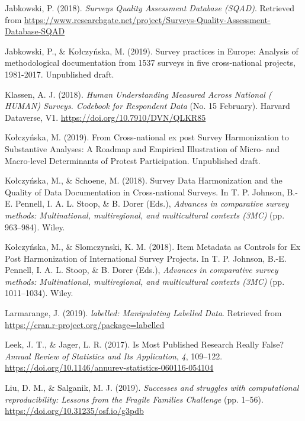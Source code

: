 \documentclass[12pt,]{article}
\begin{document}
\leavevmode\hypertarget{ref-Jabkowski2018}{}%
Jabkowski, P. (2018). \emph{Surveys Quality Assessment Database (SQAD)}. Retrieved from \url{https://www.researchgate.net/project/Surveys-Quality-Assessment-Database-SQAD}

\leavevmode\hypertarget{ref-Jabkowski2019}{}%
Jabkowski, P., \& Kołczyńska, M. (2019). Survey practices in Europe: Analysis of methodological documentation from 1537 surveys in five cross-national projects, 1981-2017. Unpublished draft.

\leavevmode\hypertarget{ref-Klassen2018}{}%
Klassen, A. J. (2018). \emph{Human Understanding Measured Across National ( HUMAN) Surveys. Codebook for Respondent Data} (No. 15 February). Harvard Dataverse, V1. \url{https://doi.org/10.7910/DVN/QLKR85}

\leavevmode\hypertarget{ref-Kolczynska2019}{}%
Kołczyńska, M. (2019). From Cross-national ex post Survey Harmonization to Substantive Analyses: A Roadmap and Empirical Illustration of Micro- and Macro-level Determinants of Protest Participation. Unpublished draft.

\leavevmode\hypertarget{ref-KolczynskaSchoene2018}{}%
Kołczyńska, M., \& Schoene, M. (2018). Survey Data Harmonization and the Quality of Data Documentation in Cross‐national Surveys. In T. P. Johnson, B.-E. Pennell, I. A. L. Stoop, \& B. Dorer (Eds.), \emph{Advances in comparative survey methods: Multinational, multiregional, and multicultural contexts (3MC)} (pp. 963--984). Wiley.

\leavevmode\hypertarget{ref-KolczynskaSlomczynski2018}{}%
Kołczyńska, M., \& Slomczynski, K. M. (2018). Item Metadata as Controls for Ex Post Harmonization of International Survey Projects. In T. P. Johnson, B.-E. Pennell, I. A. L. Stoop, \& B. Dorer (Eds.), \emph{Advances in comparative survey methods: Multinational, multiregional, and multicultural contexts (3MC)} (pp. 1011--1034). Wiley.

\leavevmode\hypertarget{ref-labelled}{}%
Larmarange, J. (2019). \emph{labelled: Manipulating Labelled Data}. Retrieved from \url{https://cran.r-project.org/package=labelled}

\leavevmode\hypertarget{ref-Leek2017}{}%
Leek, J. T., \& Jager, L. R. (2017). Is Most Published Research Really False? \emph{Annual Review of Statistics and Its Application}, \emph{4}, 109--122. \url{https://doi.org/10.1146/annurev-statistics-060116-054104}

\leavevmode\hypertarget{ref-Liu2019}{}%
Liu, D. M., \& Salganik, M. J. (2019). \emph{Successes and struggles with computational reproducibility: Lessons from the Fragile Families Challenge} (pp. 1--56). \url{https://doi.org/10.31235/osf.io/g3pdb}
\end{document}
